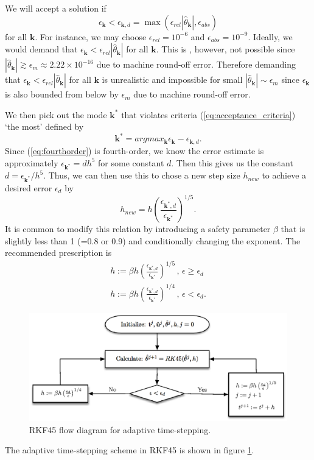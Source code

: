 \documentclass[12pt]{article}
\begin{document}
We will accept a solution if 
\begin{equation}
\label{eq:acceptance_criteria}
\epsilon_{\mathbf{k}}< \epsilon_{\mathbf{k},d} =  \max(\epsilon_{rel}|\hat{\theta}_{\mathbf{k}}|, \epsilon_{abs})
\end{equation}
for all $\mathbf{k}$. For instance, we may choose $\epsilon_{rel}=10^{-6}$ and $\epsilon_{abs}=10^{-9}$. Ideally, we would demand that $\epsilon_{\mathbf{k}}< \epsilon_{rel}|\hat{\theta}_{\mathbf{k}}|$ for all $\mathbf{k}$. This is , however, not possible since $|\hat{\theta}_{\mathbf{k}}| \gtrsim \epsilon_{m} \approx 2.22 \times 10^{-16} $ due to machine round-off error. Therefore demanding that  $\epsilon_{\mathbf{k}}< \epsilon_{rel}|\hat{\theta}_{\mathbf{k}}|$ for all $\mathbf{k}$ is unrealistic and impossible for small $|\hat{\theta}_{\mathbf{k}}| \sim \epsilon_{m}$ since $\epsilon_{\mathbf{k}} $ is also bounded from below by  $\epsilon_{m}$ due to machine round-off error. 

We then pick out the mode $\mathbf{k}^{*}$ that violates criteria (\ref{eq:acceptance_criteria}) `the most' defined by
\begin{equation}
\mathbf{k}^{*}=argmax_{\mathbf{k}} \epsilon_{\mathbf{k}}-\epsilon_{\mathbf{k},d}.
\end{equation}
Since (\ref{eq:fourthorder}) is fourth-order, we know the error estimate is approximately $\epsilon_{\mathbf{k}^{*}}=d h^{5}$ for some constant $d$. Then this gives us the constant $d= \epsilon_{\mathbf{k}^{*}}/h^5$. Thus, we can then use this to chose a new step size $h_{new}$ to achieve a desired  error $\epsilon_{d}$ by 
\begin{equation}
h_{new}=h \left(\frac{\epsilon_{\mathbf{k}^{*},d}}{\epsilon_{\mathbf{k}^{*}}}\right)^{1/5}.
\end{equation}
It is common to modify this relation by introducing a safety parameter $\beta $ that is slightly less than 1 (=0.8 or 0.9) and conditionally changing the exponent. The recommended prescription is 
\begin{eqnarray}
h := \beta h \left(\frac{\epsilon_{\mathbf{k}^{*},d}}{\epsilon_{\mathbf{k}^{*}}}\right)^{1/5} \, ,\, \epsilon \geq \epsilon_{d} \\
h := \beta h \left(\frac{\epsilon_{\mathbf{k}^{*},d}}{\epsilon_{\mathbf{k}^{*}}}\right)^{1/4}\, ,\, \epsilon <\epsilon_{d} .
\end{eqnarray}
\begin{figure}
	\centering
	\includegraphics[width=1.0\textwidth]{RK45.eps}
	\caption{RKF45 flow diagram for adaptive time-stepping.}
	\label{fig:RKF45}
\end{figure}
The adaptive time-stepping scheme in RKF45 is shown in figure \ref{fig:RKF45}. 
\end{document}
